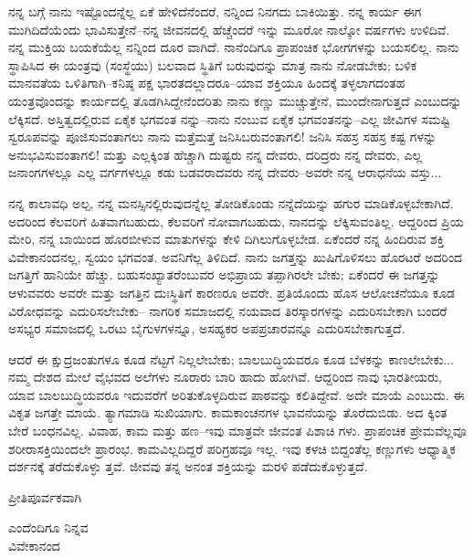 ನನ್ನ ಬಗ್ಗೆ ನಾನು ಇಷ್ಟೊಂದನ್ನೆಲ್ಲ ಏಕೆ ಹೇಳಿದೆನೆಂದರೆ, ನನ್ನಿಂದ ನಿನಗದು ಬಾಕಿಯಿತ್ತು. ನನ್ನ ಕಾರ್ಯ ಈಗ ಮುಗಿದಿದೆಯೆಂದು ಭಾವಿಸುತ್ತೇನೆ–ನನ್ನ ಜೀವನದಲ್ಲಿ ಹೆಚ್ಚೆಂದರೆ ಇನ್ನು ಮೂರೋ ನಾಲ್ಕೋ ವರ್ಷಗಳು ಉಳಿದಿವೆ. ನನ್ನ ಮುಕ್ತಿಯ ಬಯಕೆಯೆಲ್ಲ ನನ್ನಿಂದ ದೂರ ವಾಗಿದೆ. ನಾನೆಂದಿಗೂ ಪ್ರಾಪಂಚಿಕ ಭೋಗಗಳನ್ನು ಬಯಸಲಿಲ್ಲ. ನಾನು ಸ್ಥಾಪಿಸಿದ ಈ ಯಂತ್ರವು (ಸಂಸ್ಥೆಯು) ಬಲವಾದ ಸ್ಥಿತಿಗೆ ಬರುವುದನ್ನು ಮಾತ್ರ ನಾನು ನೋಡಬೇಕು; ಬಳಿಕ ಮಾನವತೆಯ ಒಳಿತಿಗಾಗಿ–ಕನಿಷ್ಠ ಪಕ್ಷ ಭಾರತದಲ್ಲಾದರೂ–ಯಾವ ಶಕ್ತಿಯೂ ಹಿಂದಕ್ಕೆ ತಳ್ಳಲಾಗದಂತಹ ಯಂತ್ರವೊಂದನ್ನು ಕಾರ್ಯದಲ್ಲಿ ತೊಡಗಿಸಿದ್ದೇನೆಂದರಿತು ನಾನು ಕಣ್ಣು ಮುಚ್ಚುತ್ತೇನೆ, ಮುಂದೇನಾಗುತ್ತದೆ ಎಂಬುದನ್ನು ಲೆಕ್ಕಿಸದೆ. ಅಸ್ತಿತ್ವದಲ್ಲಿರುವ ಏಕೈಕ ಭಗವಂತ ನನ್ನು–ನಾನು ನಂಬುವ ಏಕೈಕ ಭಗವಂತನನ್ನು–ಎಲ್ಲ ಜೀವಿಗಳ ಸಮಷ್ಟಿ ಸ್ವರೂಪವನ್ನು ಪೂಜಿಸುವಂತಾಗಲು ನಾನು ಮತ್ತೆಮತ್ತೆ ಜನಿಸಿಬರುವಂತಾಗಲಿ! ಜನಿಸಿ ಸಹಸ್ರ ಸಹಸ್ರ ಕಷ್ಟ ಗಳನ್ನು ಅನುಭವಿಸುವಂತಾಗಲಿ! ಮತ್ತು ಎಲ್ಲಕ್ಕಿಂತ ಹೆಚ್ಚಾಗಿ ದುಷ್ಟರು ನನ್ನ ದೇವರು, ದರಿದ್ರರು ನನ್ನ ದೇವರು, ಎಲ್ಲ ಜನಾಂಗಗಳಲ್ಲೂ ಎಲ್ಲ ವರ್ಗಗಳಲ್ಲೂ ಕಡು ಬಡವರಾದವರು ನನ್ನ ದೇವರು–ಅವರೇ ನನ್ನ ಆರಾಧನೆಯ ವಸ್ತು...

ನನ್ನ ಕಾಲಾವಧಿ ಅಲ್ಪ, ನನ್ನ ಮನಸ್ಸಿನಲ್ಲಿರುವುದನ್ನೆಲ್ಲ ತೋಡಿಕೊಂಡು ನನ್ನೆದೆಯನ್ನು ಹಗುರ ಮಾಡಿಕೊಳ್ಳಬೇಕಾಗಿದೆ. ಅದರಿಂದ ಕೆಲವರಿಗೆ ಹಿತವಾಗಬಹುದು, ಕೆಲವರಿಗೆ ನೋವಾಗಬಹುದು, ನಾನದನ್ನು ಲೆಕ್ಕಿಸುವಂತಿಲ್ಲ. ಆದ್ದರಿಂದ ಪ್ರಿಯ ಮೇರಿ, ನನ್ನ ಬಾಯಿಂದ ಹೊರಬೀಳುವ ಮಾತುಗಳನ್ನು ಕೇಳಿ ದಿಗಿಲುಗೊಳ್ಳಬೇಡ. ಏಕೆಂದರೆ ನನ್ನ ಹಿಂದಿರುವ ಶಕ್ತಿ ವಿವೇಕಾನಂದನಲ್ಲ, ಸ್ವಯಂ ಭಗವಂತ. ಅವನಿಗೆಲ್ಲ ತಿಳಿದಿದೆ. ನಾನು ಜಗತ್ತನ್ನು ಖುಷಿಗೊಳಿಸಲು ಹೊರಟರೆ ಅದರಿಂದ ಜಗತ್ತಿಗೆ ಹಾನಿಯೇ ಹೆಚ್ಚು. ಬಹುಸಂಖ್ಯಾತರೆಂಬುವರ ಅಭಿಪ್ರಾಯ ತಪ್ಪಾಗಿರಲೇ ಬೇಕು; ಏಕೆಂದರೆ ಈ ಜಗತ್ತನ್ನು ಆಳುವವರು ಅವರೇ ಮತ್ತು ಜಗತ್ತಿನ ದುಃಸ್ಥಿತಿಗೆ ಕಾರಣರೂ ಅವರೇ. ಪ್ರತಿಯೊಂದು ಹೊಸ ಆಲೋಚನೆಯೂ ಕೂಡ ವಿರೋಧವನ್ನು ಎದುರಿಸಲೇಬೇಕು– ನಾಗರಿಕ ಸಮಾಜದಲ್ಲಿ ನಯವಾದ ತಿರಸ್ಕಾರಗಳನ್ನು ಎದುರಿಸಬೇಕಾಗಿ ಬಂದರೆ ಅಸಭ್ಯರ ಸಮಾಜದಲ್ಲಿ ಒರಟು ಬೈಗುಳಗಳನ್ನೂ, ಅಸಹ್ಯಕರ ಅಪಪ್ರಚಾರವನ್ನೂ ಎದುರಿಸಬೇಕಾಗುತ್ತದೆ.

ಆದರೆ ಈ ಕ್ಷುದ್ರಜಂತುಗಳೂ ಕೂಡ ನೆಟ್ಟಗೆ ನಿಲ್ಲಲೇಬೇಕು; ಬಾಲಬುದ್ಧಿಯವರೂ ಕೂಡ ಬೆಳಕನ್ನು ಕಾಣಲೇಬೇಕು... ನಮ್ಮ ದೇಶದ ಮೇಲೆ ವೈಭವದ ಅಲೆಗಳು ನೂರಾರು ಬಾರಿ ಹಾದು ಹೋಗಿವೆ. ಆದ್ದರಿಂದ ನಾವು ಭಾರತೀಯರು, ಯಾವ ಬಾಲಬುದ್ಧಿಯವರೂ ಇದುವರೆಗೆ ಅರಿತುಕೊಳ್ಳದಿರುವ ಪಾಠವನ್ನು ಕಲಿತಿದ್ದೇವೆ. ಅದೇ ಮಾಯೆ ಎಂಬುದು. ಈ ವಿಕೃತ ಜಗತ್ತೇ ಮಾಯೆ. ತ್ಯಾಗಮಾಡಿ ಸುಖಿಯಾಗು. ಕಾಮಕಾಂಚನಗಳ ಭಾವನೆಯನ್ನು ತೊರೆದುಬಿಡು. ಅದ ಕ್ಕಿಂತ ಬೇರೆ ಬಂಧನವಿಲ್ಲ. ವಿವಾಹ, ಕಾಮ ಮತ್ತು ಹಣ–ಇವು ಮಾತ್ರವೇ ಜೀವಂತ ಪಿಶಾಚಿ ಗಳು. ಪ್ರಾಪಂಚಿಕ ಪ್ರೇಮವೆಲ್ಲವೂ ಶರೀರಾಸಕ್ತಿಯಿಂದಲೇ ಪ್ರಾರಂಭ. ಕಾಮವಿಲ್ಲದಿದ್ದರೆ ಪರಿಗ್ರಹವೂ ಇಲ್ಲ. ಇವು ಕಳಚಿ ಬಿದ್ದಂತೆಲ್ಲ ಕಣ್ಣುಗಳು ಆಧ್ಯಾತ್ಮಿಕ ದರ್ಶನಕ್ಕೆ ತರೆದುಕೊಳ್ಳು ತ್ತವೆ. ಜೀವವು ತನ್ನ ಅನಂತ ಶಕ್ತಿಯನ್ನು ಮರಳಿ ಪಡೆದುಕೊಳ್ಳುತ್ತದೆ.

ಪ್ರೀತಿಪೂರ್ವಕವಾಗಿ

\begin{flushright}
ಎಂದೆಂದಿಗೂ ನಿನ್ನವ\\ವಿವೇಕಾನಂದ
\end{flushright}

